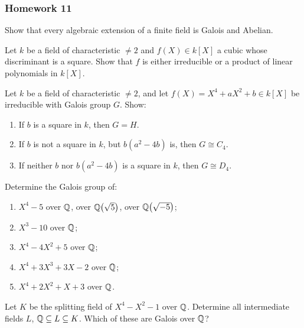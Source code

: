 \subsubsection{Homework 11}
\setcounter{exercise}{0} \setcounter{equation}{0}

\begin{problem}
  Show that every algebraic extension of a finite field is Galois and
  Abelian.
\end{problem}
\begin{solution}
\end{solution}

\begin{problem}
  Let \(k\) be a field of characteristic \(\neq 2\) and \(f(X)\in k[X]\) a
  cubic whose discriminant is a square. Show that \(f\) is either
  irreducible or a product of linear polynomials in \(k[X]\).
\end{problem}
\begin{solution}
\end{solution}

\begin{problem}
  Let \(k\) be a field of characteristic \(\neq 2\), and let
  \(f(X)=X^4+aX^2+b\in k[X]\) be irreducible with Galois group \(G\). Show:
  \begin{enumerate}[label=(\roman*)]
  \item If \(b\) is a square in \(k\), then \(G=H\).
  \item If \(b\) is not a square in \(k\), but \(b(a^2-4b)\) is, then
    \(G\cong C_4\).
  \item If neither \(b\) nor \(b(a^2-4b)\) is a square in \(k\), then
    \(G\cong D_4\).
  \end{enumerate}
\end{problem}
\begin{solution}
\end{solution}

\begin{problem}
  Determine the Galois group of:
  \begin{enumerate}[label=(\alph*)]
  \item \(X^4-5\) over \(\mathbb{Q}\), over \(\mathbb{Q}\bigl(\sqrt{5}\bigr)\), over
    \(\mathbb{Q}\bigl(\sqrt{-5}\bigr)\);
  \item \(X^3-10\) over \(\mathbb{Q}\);
  \item \(X^4-4X^2+5\) over \(\mathbb{Q}\);
  \item \(X^4+3X^3+3X-2\) over \(\mathbb{Q}\);
  \item \(X^4+2X^2+X+3\) over \(\mathbb{Q}\).
  \end{enumerate}
\end{problem}
\begin{solution}
\end{solution}

\begin{problem}
  Let \(K\) be the splitting field of \(X^4-X^2-1\) over
  \(\mathbb{Q}\). Determine all intermediate fields \(L\),
  \(\mathbb{Q}\subseteq L\subseteq K\). Which of these are Galois over \(\mathbb{Q}\)?
\end{problem}
\begin{solution}
\end{solution}

